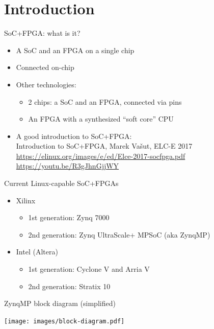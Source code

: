 \documentclass[xetex,table]{beamer}
\begin{document}
\section{Introduction}

\begin{frame}{SoC+FPGA: what is it?}
  \begin{itemize}
  \item A SoC and an FPGA on a single chip
  \item Connected on-chip
  \item Other technologies:
    \begin{itemize}
    \item 2 chips: a SoC and an FPGA, connected via pins
    \item An FPGA with a synthesized ``soft core'' CPU
    \end{itemize}
  \item A good introduction to SoC+FPGA:\\
    Introduction to SoC+FPGA, Marek Vašut, ELC-E 2017\\
    {\footnotesize\url{https://elinux.org/images/e/ed/Elce-2017-socfpga.pdf}}\\
    {\footnotesize\url{https://youtu.be/R3gJhnGjjWY}}
  \end{itemize}
\end{frame}

\begin{frame}{Current Linux-capable SoC+FPGAs}
  \begin{itemize}
  \item Xilinx
    \begin{itemize}
    \item 1st generation: Zynq 7000
    \item 2nd generation: Zynq UltraScale+ MPSoC (aka ZynqMP)
    \end{itemize}
  \item Intel (Altera)
    \begin{itemize}
    \item 1st generation: Cyclone V and Arria V
    \item 2nd generation: Stratix 10
    \end{itemize}
  \end{itemize}
\end{frame}

\begin{frame}{ZynqMP block diagram (simplified)}
  \begin{center}
    \texttt{[image: images/block-diagram.pdf]}
  \end{center}
\end{frame}
\end{document}
